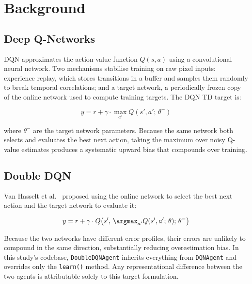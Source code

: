 \documentclass[a4paper]{article}
\begin{document}
\section{Background}
\label{sec:background}

\subsection{Deep Q-Networks}

DQN \cite{mnih2015human} approximates the action-value function $Q(s, a)$ using a
convolutional neural network. Two mechanisms stabilise training on raw pixel inputs:
experience replay, which stores transitions in a buffer and samples them randomly to break
temporal correlations; and a target network, a periodically frozen copy of the online
network used to compute training targets. The DQN TD target is:

\begin{equation}
    y = r + \gamma \cdot \max_{a'} Q(s', a';\, \theta^{-})
\end{equation}

where $\theta^{-}$ are the target network parameters. Because the same network both selects
and evaluates the best next action, taking the maximum over noisy Q-value estimates produces
a systematic upward bias that compounds over training.

\subsection{Double DQN}

Van Hasselt et al.\ \cite{van2016deep} proposed using the online network to select the
best next action and the target network to evaluate it:

\begin{equation}
    y = r + \gamma \cdot Q\!\left(s',\, \argmax_{a'} Q(s', a';\, \theta);\, \theta^{-}\right)
\end{equation}

Because the two networks have different error profiles, their errors are unlikely to
compound in the same direction, substantially reducing overestimation bias. In this study's
codebase, \texttt{DoubleDQNAgent} inherits everything from \texttt{DQNAgent} and overrides
only the \texttt{learn()} method. Any representational difference between the two agents is
attributable solely to this target formulation.
\end{document}
